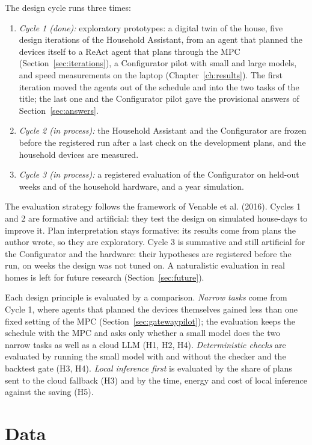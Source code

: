 \documentclass[12pt,a4paper]{report}
\begin{document}
The design cycle runs three times:

\begin{enumerate}[nosep]
\item \textit{Cycle 1 (done):} exploratory prototypes: a digital twin
of the house, five design iterations of the Household Assistant, from
an agent that planned the devices itself to a ReAct agent that plans
through the MPC (Section~\ref{sec:iterations}), a Configurator pilot
with small and large models, and speed measurements on the laptop
(Chapter~\ref{ch:results}). The first iteration moved the agents out of
the schedule and into the two tasks of the title; the last one and the
Configurator pilot gave the provisional answers of
Section~\ref{sec:answers}.
\item \textit{Cycle 2 (in process):} the Household Assistant and the
Configurator are frozen before the registered run after a last check on
the development plans, and the household devices are measured.
\item \textit{Cycle 3 (in process):} a registered evaluation of the
Configurator on held-out weeks and of the household hardware, and a
year simulation.
\end{enumerate}

The evaluation strategy follows the framework of
Venable et al. (2016). Cycles 1 and 2 are formative and artificial:
they test the design on simulated house-days to improve it. Plan
interpretation stays formative: its results come from plans the author
wrote, so they are exploratory. Cycle 3 is summative and still
artificial for the Configurator and the hardware: their hypotheses are
registered before the run, on weeks the design was not tuned on. A naturalistic
evaluation in real homes is left for future research
(Section~\ref{sec:future}).

Each design principle is evaluated by a comparison. \textit{Narrow
tasks} come from Cycle 1, where agents that planned the devices
themselves gained less than one fixed setting of the MPC
(Section~\ref{sec:gatewaypilot}); the evaluation keeps the schedule with
the MPC and asks only whether a small model does the two narrow tasks
as well as a cloud LLM (H1, H2, H4). \textit{Deterministic checks} are
evaluated by running the small model with and without the checker and
the backtest gate (H3, H4). \textit{Local inference first} is evaluated
by the share of plans sent to the cloud fallback (H3) and by the time,
energy and cost of local inference against the saving (H5).

\section{Data}
\label{sec:data}
\end{document}
